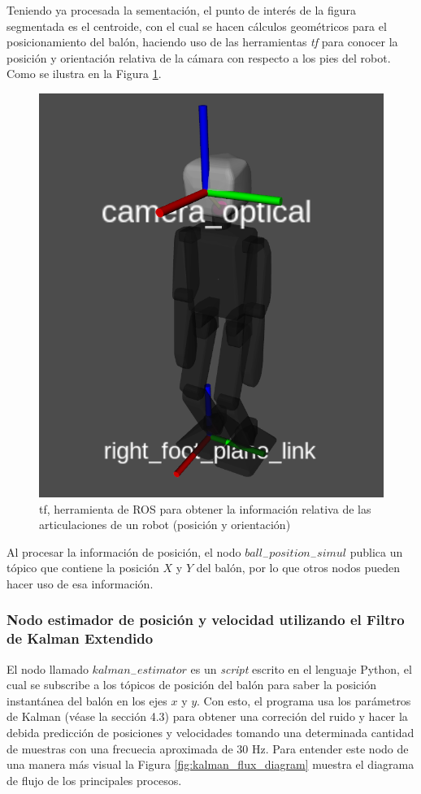 			Teniendo ya procesada la sementación, el punto de interés de la figura segmentada es el centroide, con el cual se hacen cálculos geométricos para el posicionamiento del balón, haciendo uso de las herramientas \textit{tf} para conocer la posición y orientación relativa de la cámara con respecto a los pies del robot. Como se ilustra en la Figura \ref{fig:tf}.
			
\begin{figure}
	\centering
	\includegraphics[scale=0.25]{images/tf.png}
	\caption{tf, herramienta de ROS para obtener la información relativa de las articulaciones de un robot (posición y orientación)}
	\label{fig:tf}
\end{figure}
	
			Al procesar la información de posición, el nodo $ball_-position_-simul$ publica un tópico que contiene la posición $X$ y $Y$ del balón, por lo que otros nodos pueden hacer uso de esa información.
			
			\subsubsection*{Nodo estimador de posición y velocidad utilizando el Filtro de Kalman Extendido}
			El nodo llamado $kalman_-estimator$ es un \textit{script} escrito en el lenguaje Python, el cual se subscribe a los tópicos de posición del balón para saber la posición instantánea del balón en los ejes $x$ y $y$. Con esto, el programa usa los parámetros de Kalman (véase la sección 4.3) para obtener una correción del ruido y hacer la debida predicción de posiciones y velocidades tomando una determinada cantidad de muestras con una frecuecia aproximada de 30 Hz. Para entender este nodo de una manera más visual la Figura \ref{fig:kalman_flux_diagram} muestra el diagrama de flujo de los principales procesos. 
			
